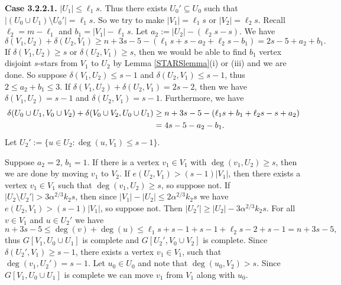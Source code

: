 \documentclass[oneside,12pt]{memoir}
\begin{document}
\textbf{Case 3.2.2.1.} $|U_1|\leq \ell_1s$.  Thus there exists $U_0'\subseteq U_0$ such that $|(U_0\cup U_1)\setminus U_0'|=\ell_1s$.  So we try to make $|V_1|=\ell_1s$ or $|V_2|=\ell_2s$.  Recall $\ell_2=m-\ell_1$ and $b_1=|V_1|-\ell_1s$.  Let $a_2:=|U_2|-(\ell_2s-s)$.  We have 
\begin{equation}
\delta(V_1, U_2)+\delta(U_2, V_1)\geq n+3s-5-(\ell_1s+s-a_2+\ell_2s-b_1)=2s-5+a_2+b_1.  
\end{equation}
If $\delta(V_1, U_2)\geq s$ or $\delta(U_2, V_1)\geq s$, then we would be able to find $b_1$ vertex disjoint $s$-stars from $V_1$ to $U_2$ by Lemma \ref{STARSlemma}(i) or (iii) and we are done.  So suppose $\delta(V_1, U_2)\leq s-1$ and $\delta(U_2, V_1)\leq s-1$, thus $2\leq a_2+b_1\leq 3$.  If $\delta(V_1, U_2)+\delta(U_2, V_1)= 2s-2$, then we have $\delta(V_1, U_2)= s-1$ and $\delta(U_2, V_1)= s-1$.  
Furthermore, we have 
\begin{align}
\delta(U_0\cup U_1, V_0\cup V_2)+\delta(V_0\cup V_2, U_0\cup U_1)&\geq n+3s-5-(\ell_1s+b_1+\ell_2s-s+a_2) \notag \\
&=4s-5-a_2-b_1. \label{U0U1<->V0V2-3221}
\end{align}
Let $U_2':=\{u\in U_2: \deg(u, V_1)\leq s-1\}$.

Suppose $a_2=2$, $b_1=1$.  If there is a vertex $v_1\in V_1$ with $\deg(v_1, U_2)\geq s$, then we are done by moving $v_1$ to $V_2$.  If $e(U_2, V_1)>(s-1)|V_1|$, then there exists a vertex $v_1\in V_1$ such that $\deg(v_1, U_2)\geq s$, so suppose not. If $|U_2\setminus U_2'|>3\alpha^{2/3}k_2s$, then since $|V_1|-|U_2|\leq 2\alpha^{2/3}k_2s$ we have $e(U_2, V_1)>(s-1)|V_1|$, so suppose not.  Then $|U_2'|\geq |U_2|-3\alpha^{2/3}k_2s$.  For all $v\in V_1$ and $u\in U_2'$ we have 
\begin{equation}\label{32211}
n+3s-5\leq \deg(v)+\deg(u)\leq \ell_1s+s-1+s-1+\ell_2s-2+s-1=n+3s-5,
\end{equation}
thus $G[V_1, U_0\cup U_1]$ is complete and $G[U_2', V_0\cup V_2]$ is complete.  Since $\delta(U_2', V_1)\geq s-1$, there exists a vertex $v_1\in V_1$, such that $\deg(v_1, U_2')= s-1$.  Let $u_0\in U_0$ and note that $\deg(u_0, V_2)>s$.  Since $G[V_1, U_0\cup U_1]$ is complete we can move $v_1$ from $V_1$ along with $u_0$.
\end{document}
